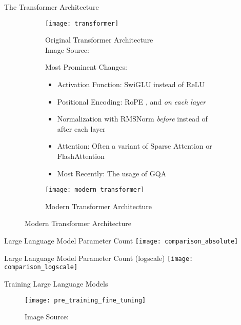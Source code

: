 \begin{frame}[c]{The Transformer Architecture}
    \begin{figure}
        \captionsetup[subfigure]{labelformat=empty}
        \begin{subfigure}{0.3\textwidth}
            \centering
            \texttt{[image: transformer]}
            \caption{
                Original Transformer Architecture \\
            Image Source: \cite{vaswani_attention_2017}
            } 
        \end{subfigure}%
        \begin{subfigure}{0.45\textwidth}
            Most Prominent Changes:
            \begin{itemize}[<+(1)->]
                \item Activation Function: \gls{SwiGLU} \cite{shazeer_glu_2020} instead of \gls{ReLU}
                \item Positional Encoding: \acrfull{RoPE} \cite{su_roformer_2022}, and \textit{on each layer}
                \item Normalization with RMSNorm \cite{ba_layer_2016} \textit{before} instead of after each layer
                \item Attention: Often a variant of Sparse Attention \cite{child_generating_2019} or FlashAttention \cite{dao_flashattention_2022}
                \item Most Recently: The usage of \acrfull{GQA} \cite{ainslie_gqa_2023}
            \end{itemize}
            \vspace{1em}
        \end{subfigure}%
        \hspace{1em}
        \begin{subfigure}{0.2\textwidth}
            \centering
            \texttt{[image: modern\_transformer]}
            \caption{
                Modern Transformer Architecture
            }
        \end{subfigure}
    \end{figure} 
\end{frame}


\begin{frame}[c]{Large Language Model Parameter Count}
    \centering
    \texttt{[image: comparison\_absolute]}
\end{frame}

\begin{frame}[c]{Large Language Model Parameter Count (logscale)}
    \centering
    \texttt{[image: comparison\_logscale]}
\end{frame}


\begin{frame}[c]{Training Large Language Models}
    \begin{figure}
        \texttt{[image: pre\_training\_fine\_tuning]}
        \caption{
            Image Source: \cite{ghosh_empowering_2023}
        }
    \end{figure}
\end{frame}
